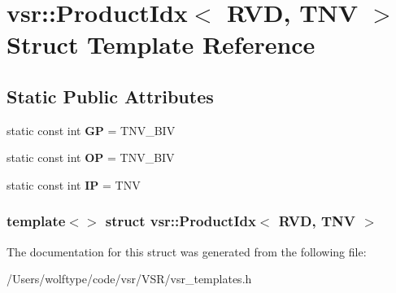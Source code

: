 \hypertarget{structvsr_1_1_product_idx_3_01_r_v_d_00_01_t_n_v_01_4}{\section{vsr\-:\-:Product\-Idx$<$ R\-V\-D, T\-N\-V $>$ Struct Template Reference}
\label{structvsr_1_1_product_idx_3_01_r_v_d_00_01_t_n_v_01_4}
}
\subsection*{Static Public Attributes}
\begin{DoxyCompactItemize}
\item 
\hypertarget{structvsr_1_1_product_idx_3_01_r_v_d_00_01_t_n_v_01_4_afadf3bba182c1c2e597b0b2641a4783c}{static const int {\bfseries G\-P} = T\-N\-V\-\_\-\-B\-I\-V}\label{structvsr_1_1_product_idx_3_01_r_v_d_00_01_t_n_v_01_4_afadf3bba182c1c2e597b0b2641a4783c}

\item 
\hypertarget{structvsr_1_1_product_idx_3_01_r_v_d_00_01_t_n_v_01_4_a52230e91907e31f515028df1734cb5a7}{static const int {\bfseries O\-P} = T\-N\-V\-\_\-\-B\-I\-V}\label{structvsr_1_1_product_idx_3_01_r_v_d_00_01_t_n_v_01_4_a52230e91907e31f515028df1734cb5a7}

\item 
\hypertarget{structvsr_1_1_product_idx_3_01_r_v_d_00_01_t_n_v_01_4_a5d9e2a206f7b3b72682487ab6dd26c9b}{static const int {\bfseries I\-P} = T\-N\-V}\label{structvsr_1_1_product_idx_3_01_r_v_d_00_01_t_n_v_01_4_a5d9e2a206f7b3b72682487ab6dd26c9b}

\end{DoxyCompactItemize}
\subsubsection*{template$<$$>$ struct vsr\-::\-Product\-Idx$<$ R\-V\-D, T\-N\-V $>$}



The documentation for this struct was generated from the following file\-:\begin{DoxyCompactItemize}
\item 
/\-Users/wolftype/code/vsr/\-V\-S\-R/vsr\-\_\-templates.\-h\end{DoxyCompactItemize}
